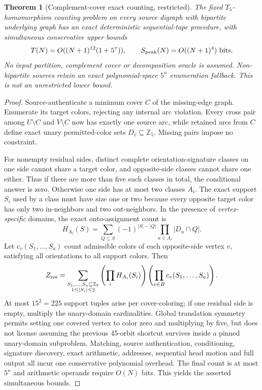 \documentclass[11pt]{article}
\newtheorem{theorem}{Theorem}
\begin{document}
\begin{theorem}[Complement-cover exact counting, restricted]
The fixed $T_5$-homomorphism counting problem on every source digraph
with bipartite underlying graph has an exact deterministic
sequential-tape procedure, with simultaneous conservative upper bounds
\[
 T(N)=O((N+1)^{12}(1+5^\tau)),\qquad
 S_{\rm peak}(N)=O((N+1)^4)\ {\rm bits}.
\]
No input partition, complement cover or decomposition oracle is assumed.
Non-bipartite sources retain an exact polynomial-space $5^n$
enumeration fallback. This is not an unrestricted lower bound.
\end{theorem}
\begin{proof}
Source-authenticate a minimum cover $C$ of the missing-edge graph.
Enumerate its target colors, rejecting any internal arc violation.
Every cross pair among $U\setminus C$ and $V\setminus C$ now has exactly
one source arc, while retained arcs from $C$ define exact unary
permitted-color sets $D_v\subseteq\mathbb Z_5$. Missing pairs impose no
constraint.

For nonempty residual sides, distinct complete orientation-signature
classes on one side cannot share a target color, and opposite-side
classes cannot share one either. Thus if there are more than five such
classes in total, the conditional answer is zero. Otherwise one side
has at most two classes $A_i$. The exact support $S_i$ used by a class
must have size one or two because every opposite target color has only
two in-neighbors and two out-neighbors. In the presence of
\emph{vertex-specific} domains, the exact onto-assignment count is
\[
 H_{A_i}(S)=\sum_{Q\subseteq S}(-1)^{|S|-|Q|}
                  \prod_{u\in A_i}|D_u\cap Q|.
\]
Let $c_v(S_1,\ldots,S_a)$ count admissible colors of each opposite-side
vertex $v$, satisfying all orientations to all support colors.
Then
\[
 Z_{\rm res}=
 \sum_{\substack{S_1,\ldots,S_a\subseteq\mathbb Z_5\\
                 1\le |S_i|\le 2}}
 \left(\prod_iH_{A_i}(S_i)\right)
 \left(\prod_{v\in B}c_v(S_1,\ldots,S_a)\right).
\]
At most $15^2=225$ support tuples arise per cover-coloring; if one
residual side is empty, multiply the unary-domain cardinalities.
Global translation symmetry permits setting one covered vertex to
color zero and multiplying by five, but does not license assuming
the previous 45-orbit shortcut survives inside a pinned unary-domain
subproblem. Matching, source authentication, conditioning, signature
discovery, exact arithmetic, addresses, sequential head motion and
full output all incur one conservative polynomial overhead.
The final count is at most $5^n$ and arithmetic operands require
$O(N)$ bits. This yields the asserted simultaneous bounds.
\end{proof}
\end{document}
